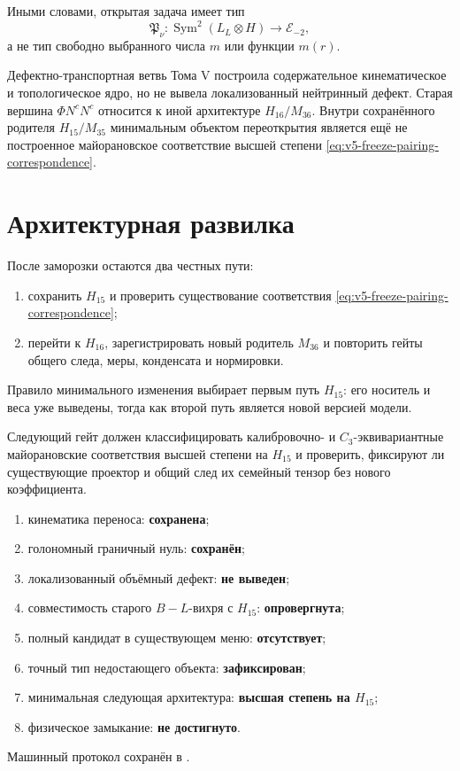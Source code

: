 Иными словами, открытая задача имеет тип
\begin{equation}
 \mathfrak P_\nu:
 \operatorname{Sym}^2(L_L\otimes H)
 \longrightarrow \mathcal E_{-2},
 \label{eq:v5-freeze-pairing-correspondence}
\end{equation}
а не тип свободно выбранного числа $m$ или функции $m(r)$.

\begin{theorem}
Дефектно-транспортная ветвь Тома V построила содержательное кинематическое
и топологическое ядро, но не вывела локализованный нейтринный дефект.
Старая вершина $\Phi N^cN^c$ относится к иной архитектуре $H_{16}/M_{36}$.
Внутри сохранённого родителя $H_{15}/M_{35}$ минимальным объектом
переоткрытия является ещё не построенное майорановское соответствие высшей
степени \eqref{eq:v5-freeze-pairing-correspondence}.
\end{theorem}

\section{Архитектурная развилка}

После заморозки остаются два честных пути:
\begin{enumerate}
 \item сохранить $H_{15}$ и проверить существование соответствия
 \eqref{eq:v5-freeze-pairing-correspondence};
 \item перейти к $H_{16}$, зарегистрировать новый родитель $M_{36}$ и
 повторить гейты общего следа, меры, конденсата и нормировки.
\end{enumerate}
Правило минимального изменения выбирает первым путь $H_{15}$: его носитель
и веса уже выведены, тогда как второй путь является новой версией модели.

Следующий гейт должен классифицировать калибровочно- и
$C_3$-эквивариантные майорановские соответствия высшей степени на
$H_{15}$ и проверить, фиксируют ли существующие проектор и общий след их
семейный тензор без нового коэффициента.

\begin{protocol}
\begin{enumerate}
 \item кинематика переноса: \textbf{сохранена};
 \item голономный граничный нуль: \textbf{сохранён};
 \item локализованный объёмный дефект: \textbf{не выведен};
 \item совместимость старого $B-L$-вихря с $H_{15}$:
 \textbf{опровергнута};
 \item полный кандидат в существующем меню: \textbf{отсутствует};
 \item точный тип недостающего объекта: \textbf{зафиксирован};
 \item минимальная следующая архитектура: \textbf{высшая степень на $H_{15}$};
 \item физическое замыкание: \textbf{не достигнуто}.
\end{enumerate}
\end{protocol}

Машинный протокол сохранён в
.